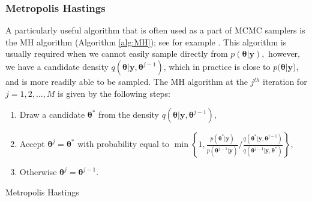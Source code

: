 \documentclass[article]{jss}
\begin{document}
\subsubsection{Metropolis Hastings}
\label{sub:Metropolis-Hastings}

A particularly useful algorithm that is often used as a part of MCMC
samplers is the MH algorithm (Algorithm \ref{alg:MH}); see for example
\citet{RobertCassela1999}. This algorithm is usually required when we
cannot easily sample directly from $p(\bm{\theta}|\bm{y}),$ however,
we have a candidate density
$q(\bm{\theta}|\bm{y},\bm{\theta}^{j-1})$, which
in practice is close to $p(\bm{\theta}|\bm{y}$), and is more readily
able to be sampled. The MH algorithm at the $j^{th}$ iteration for
$j=1,2,\dots,M$ is given by the following steps:

%
\begin{algorithm}[H]
\begin{enumerate}
\item Draw a candidate $\bm{\bm{\theta}}^{\ast}$ from the density $q\left(\bm{\bm{\theta}}|\bm{y},\bm{\theta}^{j-1}\right),$ 
\item Accept $\bm{\theta}^{j}=\bm{\theta}^{\ast}$ with probability equal
to $\min\left\{ 1,\frac{p\left(\bm{\theta}^{\ast}|\bm{y}\right)}{p\left(\bm{\theta}^{j-1}|\bm{y}\right)}/\frac{q\left(\bm{\theta}^{\ast}|\bm{y},\bm{\theta}^{j-1}\right)}{q\left(\bm{\theta}^{j-1}|\bm{y},\bm{\theta}^{*}\right)}\right\} ,$ 
\item Otherwise $\bm{\theta}^{j}=\bm{\theta}^{j-1}.$ 
\end{enumerate}
\caption{Metropolis Hastings}
\label{alg:MH}
\end{algorithm}
\end{document}
